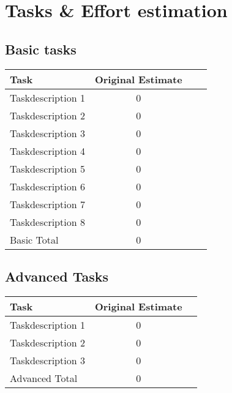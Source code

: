 %
%
%

\chapter{Tasks \& Effort estimation}


\section{Basic tasks}

\begin{tabular} {| l | c | c | c |} \hline
Task &	Original Estimate  \\ \hline
Taskdescription 1 &	0 \\ \hline
Taskdescription 2 &	0 \\ \hline
Taskdescription 3 &	0 \\ \hline
Taskdescription 4 &	0 \\ \hline
Taskdescription 5 &	0 \\ \hline
Taskdescription 6 &	0 \\ \hline
Taskdescription 7 &	0 \\ \hline
Taskdescription 8 &	0 \\ \hline
Basic Total	& 0  \\ \hline
\end{tabular}

\section{Advanced Tasks}

\begin{tabular} {| l | c | c |}\hline
Task &	Original Estimate  \\ \hline
Taskdescription 1 &	0 \\ \hline
Taskdescription 2 &	0 \\ \hline
Taskdescription 3 &	0 \\ \hline
Advanced Total & 0  \\ \hline
\end{tabular}

